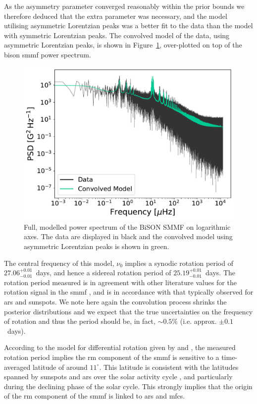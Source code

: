 As the asymmetry parameter converged reasonably within the prior bounds we therefore deduced that the extra parameter was necessary, and the model utilising asymmetric Lorentzian peaks was a better fit to the data than the model with symmetric Lorentzian peaks. The convolved model of the data, using asymmetric Lorentzian peaks, is shown in Figure~\ref{fig:BiSON_PSD_fit}, over-plotted on top of the \gls{bison} \gls{smmf} power spectrum.


\begin{figure}[ht!]
	\centering
	\includegraphics[width=\columnwidth]{BiSON_PSD_model.pdf}
	\caption{Full, modelled power spectrum of the BiSON SMMF on logarithmic axes. The data are displayed in black and the convolved model using asymmetric Lorentzian peaks is shown in green.}
	\label{fig:BiSON_PSD_fit}
\end{figure}


The central frequency of this model, $\nu_0$ implies a synodic rotation period of $27.06^{+0.01}_{-0.01}$~days, and hence a sidereal rotation period of $25.19^{+0.01}_{-0.01}$~days. The rotation period measured is in agreement with other literature values for the rotation signal in the \gls{smmf} \citep{chaplin_studies_2003, xie_temporal_2017}, and is in accordance with that typically observed for \glspl{ar} and sunspots. We note here again the convolution process shrinks the posterior distributions and we expect that the true uncertainties on the frequency of rotation and thus the period should be, in fact, $\sim 0.5\%$ (i.e. approx. $\pm 0.1$~days).

According to the model for differential rotation given by \citet{snodgrass_magnetic_1983} and \citet{brown_inferring_1989}, the measured rotation period implies the \gls{rm} component of the \gls{smmf} is sensitive to a time-averaged latitude of around $11^{\circ}$. This latitude is consistent with the latitudes spanned by sunspots and \glspl{ar} over the solar activity cycle \citep{maunder_note_1904, mcintosh_deciphering_2014, thomas_asteroseismic_2019}, and particularly during the declining phase of the solar cycle. This strongly implies that the origin of the \gls{rm} component of the \gls{smmf} is linked to \glspl{ar} and \glspl{mfc}.

